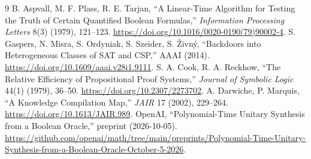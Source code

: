 \documentclass[11pt]{article}
\begin{document}
\begin{thebibliography}{9}
 B. Aspvall, M. F. Plass, R. E. Tarjan, ``A Linear-Time Algorithm for Testing the Truth of Certain Quantified Boolean Formulas,'' \emph{Information Processing Letters} 8(3) (1979), 121--123. \url{https://doi.org/10.1016/0020-0190(79)90002-4}.
 S. Gaspers, N. Misra, S. Ordyniak, S. Szeider, S. \v{Z}ivn\'y, ``Backdoors into Heterogeneous Classes of SAT and CSP,'' AAAI (2014). \url{https://doi.org/10.1609/aaai.v28i1.9111}.
 S. A. Cook, R. A. Reckhow, ``The Relative Efficiency of Propositional Proof Systems,'' \emph{Journal of Symbolic Logic} 44(1) (1979), 36--50. \url{https://doi.org/10.2307/2273702}.
 A. Darwiche, P. Marquis, ``A Knowledge Compilation Map,'' \emph{JAIR} 17 (2002), 229--264. \url{https://doi.org/10.1613/JAIR.989}.
 OpenAI, ``Polynomial-Time Unitary Synthesis from a Boolean Oracle,'' preprint (2026-10-05). \url{https://github.com/openai/math/tree/main/preprints/Polynomial-Time-Unitary-Synthesis-from-a-Boolean-Oracle-October-5-2026}.
\end{thebibliography}
\end{document}
